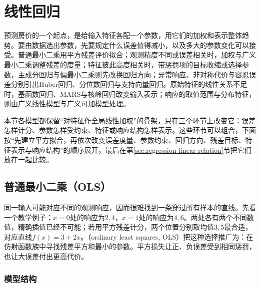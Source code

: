 \section{线性回归}
\label{sec:regression-linear}

预测房价的一个起点，是给输入特征各配一个参数，用它们的加权和表示整体趋势。要由数据选出参数，先要规定什么误差值得减小，以及多大的参数变化可以接受。普通最小二乘用平方残差评价拟合；观测精度不同或误差相关时，加权与广义最小二乘调整残差的度量；特征彼此高度相关时，带惩罚项的目标收缩或选择参数，主成分回归与偏最小二乘则先改换回归方向；异常响应、非对称代价与容忍误差分别引出Huber回归、分位数回归与支持向量回归。原始特征的线性关系不足时，基函数回归、MARS与核岭回归改变输入表示；响应的取值范围与分布特征，则由广义线性模型与广义可加模型处理。

本节各模型都保留“对特征作全局线性加权”的骨架，只在三个环节上改变它：误差怎样计分、参数怎样受约束、特征或响应结构怎样表示。这些环节可以组合，下面按“先建立平方拟合，再依次改变误差度量、参数约束、回归方向、残差目标、特征表示与响应结构”的顺序展开，最后在第\ref{sec:regression-linear-relation}节把它们放在一起比较。

\subsection{普通最小二乘（OLS）}
\label{sec:regression-ols}

同一输入可能对应不同的观测响应，因而很难找到一条穿过所有样本的直线。先看一个教学例子：$x=0$处的响应为$2,4$，$x=1$处的响应为$4,6$。两处各有两个不同数值，精确插值已经不可能；若用平方残差计分，两个位置分别取均值$3,5$最合适，对应直线$f(x)=3+2x$。（ordinary least squares, OLS）把这种选择推广为：在仿射函数族中寻找残差平方和最小的参数。平方损失让正、负误差受到相同惩罚，也让大误差付出更高代价。

\subsubsection{模型结构}
\label{sec:regression-ols-structure}

